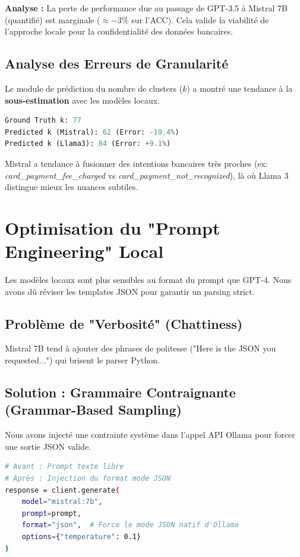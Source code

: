 \documentclass[11pt, a4paper]{article}
\begin{document}
\textbf{Analyse :} La perte de performance due au passage de GPT-3.5 à Mistral 7B (quantifié) est marginale ($\approx -3\%$ sur l'ACC). Cela valide la viabilité de l'approche locale pour la confidentialité des données bancaires.

\subsection{Analyse des Erreurs de Granularité}
Le module de prédiction du nombre de clusters ($k$) a montré une tendance à la \textbf{sous-estimation} avec les modèles locaux.

\begin{lstlisting}[language=Python, caption=Logs d'analyse Granularité]
Ground Truth k: 77
Predicted k (Mistral): 62 (Error: -19.4%)
Predicted k (Llama3): 84 (Error: +9.1%)
\end{lstlisting}

Mistral a tendance à fusionner des intentions bancaires très proches (ex: \textit{card\_payment\_fee\_charged} vs \textit{card\_payment\_not\_recognized}), là où Llama 3 distingue mieux les nuances subtiles.

\section{Optimisation du "Prompt Engineering" Local}
Les modèles locaux sont plus sensibles au format du prompt que GPT-4. Nous avons dû réviser les templates JSON pour garantir un parsing strict.

\subsection{Problème de "Verbosité" (Chattiness)}
Mistral 7B tend à ajouter des phrases de politesse ("Here is the JSON you requested...") qui brisent le parser Python.

\subsection{Solution : Grammaire Contraignante (Grammar-Based Sampling)}
Nous avons injecté une contrainte système dans l'appel API Ollama pour forcer une sortie JSON valide.

\begin{lstlisting}[language=Bash, caption=Patch appliqué au client Ollama]
# Avant : Prompt texte libre
# Après : Injection du format mode JSON
response = client.generate(
    model="mistral:7b",
    prompt=prompt,
    format="json",  # Force le mode JSON natif d'Ollama
    options={"temperature": 0.1}
)
\end{lstlisting}
\end{document}
